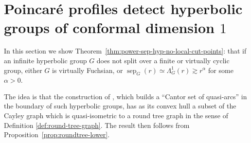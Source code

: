 \documentclass[11pt]{amsart}
\numberwithin{equation}{section}
\theoremstyle{citing}
\DeclareMathOperator{\sep}{sep}
\numberwithin{equation}{section}
\begin{document}
\section{Poincar\'e profiles detect hyperbolic groups of conformal dimension $1$}
\label{sec:no-local-cut-points}

In this section we show Theorem~\ref{thm:power-sep-hyp-no-local-cut-points}: that if an infinite hyperbolic group $G$ does not split over a finite or virtually cyclic group, either $G$ is virtually Fuchsian, or $\sep_G(r) \simeq \Lambda_G^1(r) \gtrsim r^\alpha$ for some $\alpha>0$.

The idea is that the construction of \cite{Mac-10-confdim}, which builds a ``Cantor set of quasi-arcs'' in the boundary of such hyperbolic groups, has as its convex hull a subset of the Cayley graph which is quasi-isometric to a round tree graph in the sense of Definition \ref{def:round-tree-graph}.  The result then follows from Proposition~\ref{prop:roundtree-lower}.
\end{document}
